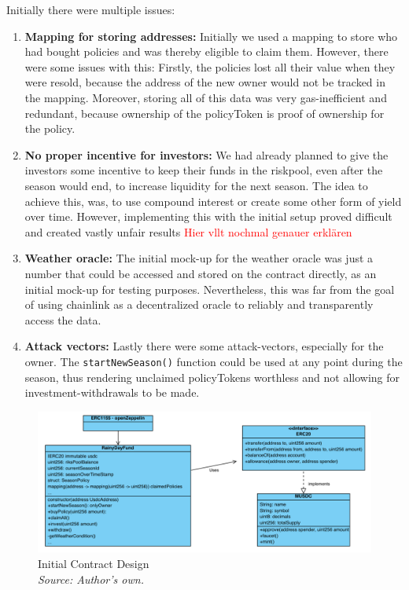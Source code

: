 \documentclass[11pt,a4paper]{article}
\begin{document}
    Initially there were multiple issues:
    \begin{enumerate}[1]
        \item \textbf{Mapping for storing addresses:} Initially we used a mapping to store who had bought policies and was thereby eligible to claim them.
        However, there were some issues with this: Firstly, the policies lost all their value when they were resold, because the address of the new owner would not be tracked in the mapping.
        Moreover, storing all of this data was very gas-inefficient and redundant, because ownership of the policyToken is proof of ownership for the policy.
        \item \textbf{No proper incentive for investors:} We had already planned to give the investors some incentive to keep their funds in the riskpool, even after the season would end, to increase liquidity for the next season.
        The idea to achieve this, was, to use compound interest or create some other form of yield over time.
        However, implementing this with the initial setup proved difficult and created vastly unfair results \textcolor{red}{Hier vllt nochmal genauer erkl\"aren}
        \item \textbf{Weather oracle:} The initial mock-up for the weather oracle was just a number that could be accessed and stored on the contract directly, as an initial mock-up for testing purposes.
        Nevertheless, this was far from the goal of using chainlink as a decentralized oracle to reliably and transparently access the data.
        \item \textbf{Attack vectors:} Lastly there were some attack-vectors, especially for the owner.
        The \texttt{startNewSeason()} function could be used at any point during the season, thus rendering unclaimed policyTokens worthless and not allowing for investment-withdrawals to be made.
    \end{enumerate}

    \begin{figure}[H]
        \centering
        \includegraphics[scale=0.5]{graphics/ClassDiagram_Old}
        \caption{Initial Contract Design \\ \textit{Source: Author's own.}}
        \label{fig:initial-contract-design}
    \end{figure}
\end{document}
